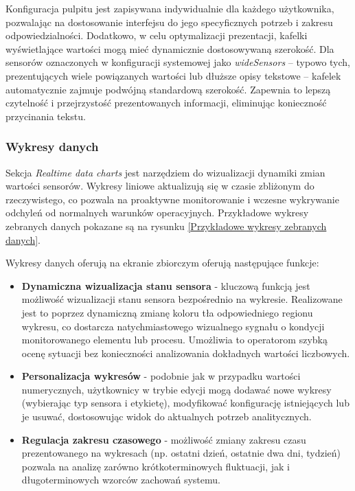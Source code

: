 \vspace{0.3em}
Konfiguracja pulpitu jest zapisywana indywidualnie dla każdego użytkownika, pozwalając na dostosowanie interfejsu do jego specyficznych potrzeb i zakresu odpowiedzialności. Dodatkowo, w celu optymalizacji prezentacji, kafelki wyświetlające wartości mogą mieć dynamicznie dostosowywaną szerokość. Dla sensorów oznaczonych w konfiguracji systemowej jako \textit{wideSensors} – typowo tych, prezentujących wiele powiązanych wartości lub dłuższe opisy tekstowe – kafelek automatycznie zajmuje podwójną standardową szerokość. Zapewnia to lepszą czytelność i przejrzystość prezentowanych informacji, eliminując konieczność przycinania tekstu.

\subsubsection{Wykresy danych}
Sekcja \textit{Realtime data charts} jest narzędziem do wizualizacji dynamiki zmian wartości sensorów. Wykresy liniowe aktualizują się w czasie zbliżonym do rzeczywistego, co pozwala na proaktywne monitorowanie i wczesne wykrywanie odchyleń od normalnych warunków operacyjnych. Przykładowe wykresy zebranych danych pokazane są na rysunku \ref{Przykładowe wykresy zebranych danych}.

\vspace{0.3em}

Wykresy danych oferują na ekranie zbiorczym oferują następujące funkcje:

\begin{itemize}
    \item \textbf{Dynamiczna wizualizacja stanu sensora} - kluczową funkcją jest możliwość wizualizacji stanu sensora bezpośrednio na wykresie. Realizowane jest to poprzez dynamiczną zmianę koloru tła odpowiedniego regionu wykresu, co dostarcza natychmiastowego wizualnego sygnału o kondycji monitorowanego elementu lub procesu. Umożliwia to operatorom szybką ocenę sytuacji bez konieczności analizowania dokładnych wartości liczbowych.
    \item \textbf{Personalizacja wykresów} - podobnie jak w przypadku wartości numerycznych, użytkownicy w trybie edycji mogą dodawać nowe wykresy (wybierając typ sensora i etykietę), modyfikować konfigurację istniejących lub je usuwać, dostosowując widok do aktualnych potrzeb analitycznych.
    \item \textbf{Regulacja zakresu czasowego} - możliwość zmiany zakresu czasu prezentowanego na wykresach (np. ostatni dzień, ostatnie dwa dni, tydzień) pozwala na analizę zarówno krótkoterminowych fluktuacji, jak i długoterminowych wzorców zachowań systemu.
\end{itemize}

